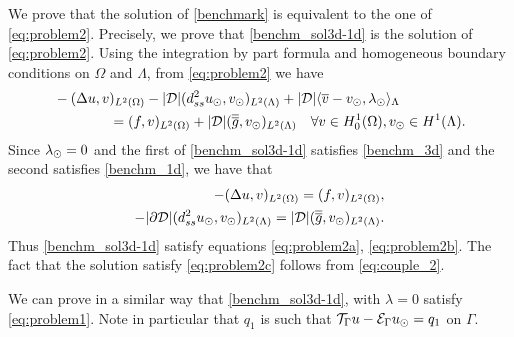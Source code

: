 \documentclass[r]{siamart171218}
\newcommand{\paoloold}[1]{{\color{black}#1}}
\begin{document}

\paoloold{We prove that the solution of \eqref{benchmark} is equivalent to the one of \eqref{eq:problem2}.}
Precisely, we prove that \eqref{benchm_sol3d-1d} is the solution of
\eqref{eq:problem2}. Using the integration by part formula and homogeneous
boundary conditions on $\Omega$ and $\Lambda$, from \eqref{eq:problem2} we have
\begin{align*}
&-(\Delta u, v)_{L^2(\Omega)} - |{\cal D}|(d^2_{ss} \ud, \vd)_{L^2(\Lambda)} 
+ |{\cal D}|\langle \avrc{v}  - \vd, \ld \rangle_\Lambda
\\
\nonumber
&\qquad\qquad= (f,v)_{L^2(\Omega)} + |{\cal D}| (\avrd{g},\vd)_{L^2(\Lambda)}
\quad \forall v \in H^1_0(\Omega), \vd \in H^1(\Lambda).
\end{align*}
Since $\lambda_{\odot}=0$ and the first of \eqref{benchm_sol3d-1d} satisfies \eqref{benchm_3d} and the second satisfies \eqref{benchm_1d}, we have that
\begin{align*}
-(\Delta u, v)_{L^2(\Omega)} =  (f,v)_{L^2(\Omega)}, 
\\
-|{\partial \cal D}|(d^2_{ss} \ud, \vd)_{L^2(\Lambda)}  = |{\cal D}| (\avrd{g},\vd)_{L^2(\Lambda)}.
\end{align*}
Thus \eqref{benchm_sol3d-1d} satisfy equations \eqref{eq:problem2a}, \eqref{eq:problem2b}.
The fact that the solution satisfy \eqref{eq:problem2c} follows from \eqref{eq:couple_2}.

We can prove in a similar way that \eqref{benchm_sol3d-1d}, with $\lambda=0$
satisfy \eqref{eq:problem1}. Note in particular that $q_1$ is such that
${\mathcal{T}_\Gamma}{u} - \mathcal{E}_\Gamma{u_{\odot}} = q_1$ on $\Gamma$.
\end{document}
